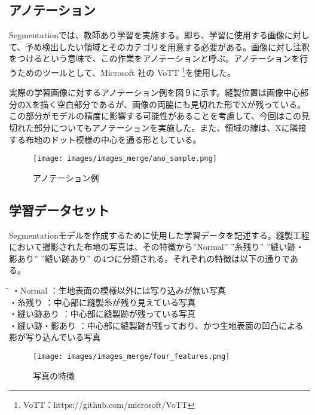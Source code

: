 \subsection{アノテーション}

Segmentationでは、教師あり学習を実施する。即ち、学習に使用する画像に対して、予め検出したい領域とそのカテゴリを用意する必要がある。画像に対し注釈をつけるという意味で、この作業をアノテーションと呼ぶ。アノテーションを行うためのツールとして、Microsoft 社の VoTT \footnote{VoTT：https:\slash\slash github.com\slash microsoft\slash VoTT}を使用した。

実際の学習画像に対するアノテーション例を図９に示す。縫製位置は画像中心部分のXを描く空白部分であるが、画像の両脇にも見切れた形でXが残っている。この部分がモデルの精度に影響する可能性があることを考慮して、今回はこの見切れた部分についてもアノテーションを実施した。また、領域の線は、Xに隣接する布地のドット模様の中心を通る形としている。
\\
\begin{figure}[h!]
\begin{center}
\texttt{[image: images/images\_merge/ano\_sample.png]}
\caption{アノテーション例}
\end{center}
\end{figure}

\subsection{学習データセット}

Segmentationモデルを作成するために使用した学習データを記述する。縫製工程において撮影された布地の写真は、その特徴から”Normal” ”糸残り” ”縫い跡・影あり” ”縫い跡あり” の4つに分類される。それぞれの特徴は以下の通りである。

\begin{tabbing}
\hspace{25mm}\= \hspace{10mm} \kill
・Normal \>：生地表面の模様以外には写り込みが無い写真 \\
・糸残り \>	：中心部に縫製糸が残り見えている写真 \\
・縫い跡あり \>：中心部に縫製跡が残っている写真 \\
・縫い跡・影あり \>：中心部に縫製跡が残っており、かつ生地表面の凹凸による影が写り込んでいる写真\\
\end{tabbing}

\begin{figure}[h!]
\begin{center}
\texttt{[image: images/images\_merge/four\_features.png]}
\caption{写真の特徴}
\end{center}
\end{figure}

